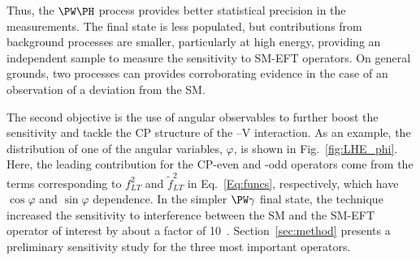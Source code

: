 \documentclass[a4paper,11pt]{article}
\renewcommand{\PV}{{{{V}}}\xspace}
\begin{document}
Thus, the $\PW\PH$ process provides better statistical precision in the measurements. 
The \PZ final state is less populated, 
but contributions from background processes are smaller, 
particularly at high energy, 
providing an independent sample to measure the sensitivity to SM-EFT operators. 
On general grounds, 
two processes can provides corroborating evidence in the case of an observation of a deviation from the SM.


The second objective is the use of
angular observables to further boost the sensitivity and tackle the CP structure of the \PH--\PV interaction. 
As an example,  the
distribution of one of the angular variables, $\varphi$, is shown in Fig.~\ref{fig:LHE_phi}. 
Here,  the leading contribution for the CP-even and -odd operators come from the terms corresponding to $f^{2}_{LT}$ and $\tilde{f}^2_{LT}$ in Eq.~\eqref{Eq:funcs}, respectively, which have $\cos\varphi$ and $\sin\varphi$ dependence.
In the simpler $\PW\gamma$ final state, the technique increased the sensitivity to interference between the SM and the SM-EFT operator of interest by about a factor of 10~\cite{CMS-PAS-SMP-20-005}.
Section~\ref{sec:method} presents a preliminary sensitivity study for the three most important operators. 
\end{document}
